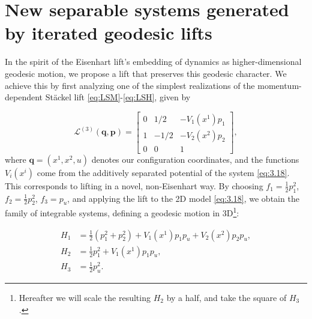 \documentclass[10pt]{amsart}
\numberwithin{equation}{section}
\newcommand{\tbf}{\textbf}
\newcommand{\bs}{\boldsymbol}
\theoremstyle{definition}
\begin{document}
	\section{New separable systems generated by iterated geodesic lifts} \label{sec:5}
	
	
	In the spirit of the Eisenhart lift's embedding of dynamics as higher-dimensional geodesic motion, we propose a lift that preserves this geodesic character. We achieve this by first analyzing one of the simplest realizations of the momentum-dependent St\"ackel lift \eqref{eq:LSM}-\eqref{eq:LSH}, given by 
	
	\begin{equation} \label{eq:4.1}
		\mathcal{L}^{(3)}(\bs{q},\bs{p})=
		\begin{bmatrix}
			0 & 1/2 & -V_1(x^1) p_1 \\ 1 & -1/2 & -V_2(x^2)p_2 \\ 0 & 0 & 1
		\end{bmatrix}, 
	\end{equation}
	where $\tbf{q}=(x^1,x^2,u)$ denotes our configuration coordinates, and the functions $V_i(x^{i})$ come from the additively separated potential of the system \eqref{eq:3.18}. This corresponds to lifting in a novel, non-Eisenhart way.
	By choosing $f_1=\frac{1}{2}p^{2}_{1}$, $f_2=\frac{1}{2}p^{2}_{2}$, $f_3= p_u$, and applying the lift to the 2D model \eqref{eq:3.18}, we obtain the family of integrable systems, defining a geodesic motion in 3D\footnote{Hereafter we will scale the resulting $H_2$ by a half, and take the square of $H_3$.}:
	
	\begin{equation} \label{Stackel Riem lift}
		\begin{split}
			H_1 &= \frac{1}{2}(p_1^2+p_2^2) + V_1(x^1) p_1 p_u+ V_2(x^2) p_2 p_u, \\ 
			H_2 &= \frac{1}{2}p_1^2+ V_1(x^1) p_1 p_u, \\ 
			H_3 &= \frac{1}{2}p_u^2.
		\end{split}
	\end{equation}
	
\end{document}
